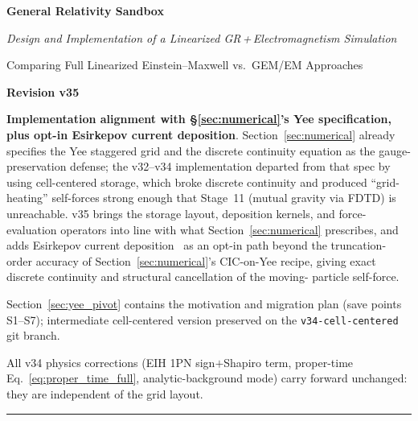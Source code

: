 \documentclass[11pt,a4paper]{article}
\begin{document}

\begin{titlepage}
  \centering
  \vspace*{3cm}
  {\Huge\bfseries\color{deepblue} General Relativity Sandbox\par}
  \vspace{0.8cm}
  {\large\itshape Design and Implementation of a Linearized GR\,+\,Electromagnetism Simulation\par}
  \vspace{0.4cm}
  {\normalsize\color{gray} Comparing Full Linearized Einstein--Maxwell vs.\ GEM/EM Approaches\par}
  \vspace{1.2cm}
  {\large\bfseries\color{midblue} Revision v35\par}
  \vspace{0.2cm}
  {\small\color{gray}
  \textbf{Implementation alignment with §\ref{sec:numerical}'s Yee
  specification, plus opt-in Esirkepov current deposition}.
  Section~\ref{sec:numerical} already specifies the Yee staggered
  grid and the discrete continuity equation as the gauge-preservation
  defense; the v32--v34 implementation departed from that spec by
  using cell-centered storage, which broke discrete continuity and
  produced ``grid-heating'' self-forces strong enough that Stage~11
  (mutual gravity via FDTD) is unreachable.  v35 brings the storage
  layout, deposition kernels, and force-evaluation operators into
  line with what Section~\ref{sec:numerical} prescribes, and adds
  Esirkepov current deposition~\cite{Esirkepov2001} as an opt-in
  path beyond the truncation-order accuracy of
  Section~\ref{sec:numerical}'s CIC-on-Yee recipe, giving exact
  discrete continuity and structural cancellation of the moving-
  particle self-force.\par
  Section~\ref{sec:yee_pivot} contains the motivation and migration
  plan (save points S1--S7); intermediate cell-centered version
  preserved on the \texttt{v34-cell-centered} git branch.\par
  All v34 physics corrections (EIH 1PN sign$+$Shapiro term,
  proper-time Eq.~\ref{eq:proper_time_full}, analytic-background
  mode) carry forward unchanged: they are independent of the grid
  layout.\par}
  \vspace{1.5cm}
  \hrule
\end{titlepage}

\tableofcontents
\newpage
\end{document}
